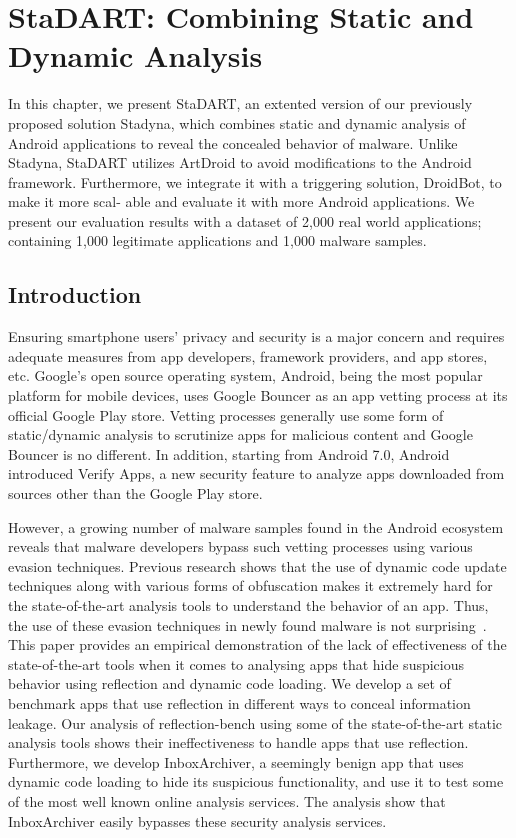 \chapter{StaDART: Combining Static and Dynamic Analysis}
In this chapter, we present StaDART, an extented version of our previously proposed solution Stadyna, which combines static and dynamic analysis of Android applications to reveal the concealed behavior of malware. Unlike Stadyna, StaDART utilizes ArtDroid to avoid modifications to the Android framework. Furthermore, we integrate it with a triggering solution, DroidBot, to make it more scal- able and evaluate it with more Android applications. We present our evaluation results with a dataset of 2,000 real world applications; containing 1,000 legitimate applications and 1,000 malware samples.



\section{Introduction}

Ensuring smartphone users' privacy and security is a major concern and requires adequate measures from app developers, framework providers, and app stores, etc. Google's open source operating system, Android, being the most popular platform for mobile devices, uses Google Bouncer as an app vetting process at its official Google Play store. Vetting processes generally use some form of static/dynamic analysis to scrutinize apps for malicious content and Google Bouncer is no different. In addition, starting from Android 7.0, Android introduced Verify Apps, a new security feature to analyze apps downloaded from sources other than the Google Play store. 


However, a growing number of malware samples found in the Android ecosystem reveals that malware developers bypass such vetting processes using various evasion techniques. Previous research shows that the use of dynamic code update techniques along with various forms of obfuscation makes it extremely hard for the state-of-the-art analysis tools to understand the behavior of an app\cite{ExecuteThis_Poeplau2014, ahmad2016empirical}. Thus, the use of these evasion techniques in newly found malware is not surprising~\cite{brain-test}. This paper provides an empirical demonstration of the lack of effectiveness of the state-of-the-art tools when it comes to analysing apps that hide suspicious behavior using reflection and dynamic code loading. We develop a set of benchmark apps that use reflection in different ways to conceal information leakage. Our analysis of reflection-bench using some of the state-of-the-art static analysis tools shows their ineffectiveness to handle apps that use reflection. Furthermore, we develop InboxArchiver, a seemingly benign app that uses dynamic code loading to hide its suspicious functionality, and use it to test some of the most well known online analysis services. The analysis show that InboxArchiver easily bypasses these security analysis services. %

